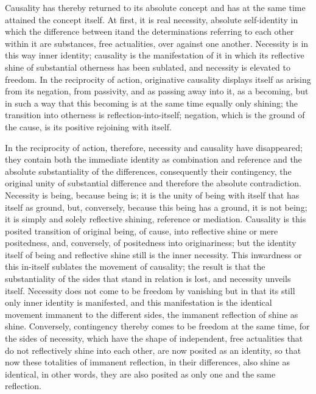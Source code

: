 Causality has thereby returned to its absolute concept
and has at the same time attained the concept itself.
At first, it is real necessity, absolute self-identity
in which the difference between itand the determinations
referring to each other within it are substances,
free actualities, over against one another.
Necessity is in this way inner identity;
causality is the manifestation of it
in which its reflective shine of
substantial otherness has been sublated,
and necessity is elevated to freedom.
In the reciprocity of action,
originative causality displays itself
as arising from its negation, from passivity,
and as passing away into it, as a becoming,
but in such a way that this becoming is
at the same time equally only shining;
the transition into otherness is reflection-into-itself;
negation, which is the ground of the cause,
is its positive rejoining with itself.

In the reciprocity of action, therefore,
necessity and causality have disappeared;
they contain both the immediate identity
as combination and reference
and the absolute substantiality of the differences,
consequently their contingency,
the original unity of substantial difference
and therefore the absolute contradiction.
Necessity is being, because being is;
it is the unity of being with itself
that has itself as ground, but, conversely,
because this being has a ground, it is not being;
it is simply and solely reflective shining, reference or mediation.
Causality is this posited transition of original being,
of cause, into reflective shine or mere positedness,
and, conversely, of positedness into originariness;
but the identity itself of being and reflective shine
still is the inner necessity.
This inwardness or this in-itself sublates
the movement of causality;
the result is that the substantiality of the sides
that stand in relation is lost, and necessity unveils itself.
Necessity does not come to be freedom by vanishing
but in that its still only inner identity is manifested,
and this manifestation is the identical movement immanent to
the different sides,
the immanent reflection of shine as shine.
Conversely, contingency thereby
comes to be freedom at the same time,
for the sides of necessity,
which have the shape of independent, free actualities
that do not reflectively shine into each other,
are now posited as an identity,
so that now these totalities of immanent reflection,
in their differences, also shine as identical,
in other words, they are also posited as
only one and the same reflection.

